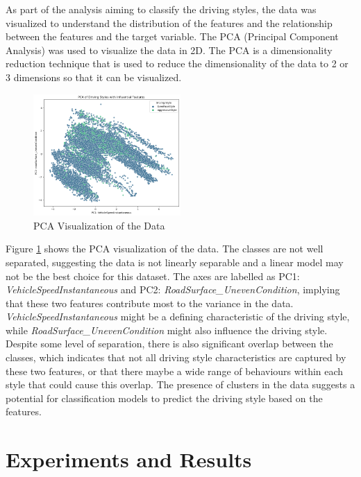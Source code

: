 \documentclass[10pt,journal,compsoc]{IEEEtran}
\begin{document}
As part of the analysis aiming to classify the driving styles, the data was visualized to understand the distribution of the features and the relationship between the features 
and the target variable. The PCA (Principal Component Analysis) was used to visualize the data in 2D. The PCA is a dimensionality reduction technique that is used to reduce the
dimensionality of the data to 2 or 3 dimensions so that it can be visualized. \cite{niedoba2014multi}

\begin{figure}
    \centering
    \includegraphics[width=0.5\textwidth]{images/pca_chart.png}
    \caption{PCA Visualization of the Data}
    \label{fig:pca}
\end{figure}

Figure \ref{fig:pca} shows the PCA visualization of the data. The classes are not well separated, suggesting the data is not
linearly separable and a linear model may not be the best choice for this dataset.
The axes are labelled as PC1: \textit{VehicleSpeedInstantaneous} and PC2: \textit{RoadSurface\_UnevenCondition}, implying that these two features contribute most to the variance in the data.
\textit{VehicleSpeedInstantaneous} might be a defining characteristic of the driving style, while \textit{RoadSurface\_UnevenCondition} might also influence the driving style.
Despite some level of separation, there is also significant overlap between the classes, which indicates that not all driving style characteristics are captured by these two features, or that there
maybe a wide range of behaviours within each style that could cause this overlap.
The presence of clusters in the data suggests a potential for classification models to predict the driving style based on the features.


\section{Experiments and Results}
\end{document}

